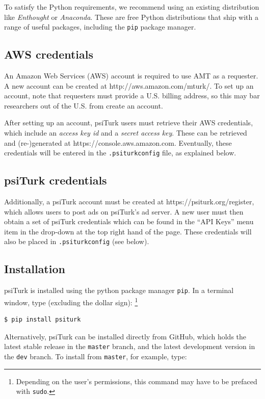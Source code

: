 \documentclass[twocolumn]{svjour3}          %
\newcommand{\psiturk}[0]{\textsf{psiTurk}}
\begin{document}
To satisfy the Python requirements, we recommend using an existing distribution like \emph{Enthought} or \emph{Anaconda}. These are free
Python distributions that ship with a range of useful packages, including the \texttt{pip} package manager. 

\subsection{AWS credentials}
An Amazon Web Services (AWS) account is required to use AMT as a requester. A new account can be created at \textsf{http://aws.amazon.com/mturk/}. 
To set up an account, note that requesters
must provide a U.S. billing address, so this may bar researchers out of the U.S. from create an account. 

After setting up an account, \psiturk{} users must retrieve their AWS credentials, which include an \emph{access key id} and a
\emph{secret access key}. These can be retrieved and (re-)generated at \textsf{https://console.aws.amazon.com}.
Eventually, these credentials will be entered in the \texttt{.psiturkconfig} file, as explained below.


\subsection{\psiturk{} credentials}
Additionally, a \psiturk{} account must be created at \textsf{https://psiturk.org/register}, which allows users to 
post ads on \psiturk{}'s ad server. A new user must then obtain a set of \psiturk{} credentials which can be found in 
the ``API Keys'' menu item in the drop-down at the top right hand of the page.
These credentials will also be placed in \texttt{.psiturkconfig} (see below).

\subsection{Installation}
\psiturk{} is installed using the python package manager \texttt{pip}. In a terminal window, type (excluding the dollar sign):
\footnote{Depending on the user's permissions, this command may have to be prefaced with \texttt{sudo}.}

\begin{lstlisting}
$ pip install psiturk
\end{lstlisting}

Alternatively, \psiturk{} can be installed directly from GitHub, which holds the latest stable
release in the \texttt{master} branch, and the latest development version in the \texttt{dev} branch. 
To install from \texttt{master}, for example, type:
\end{document}

